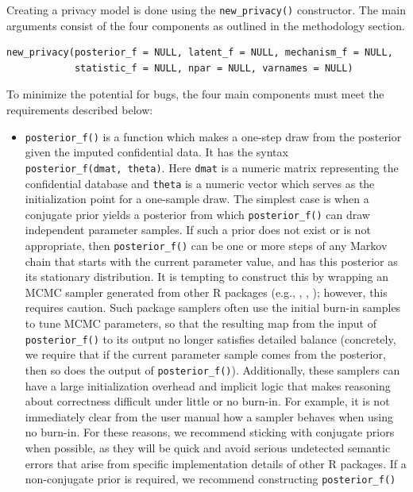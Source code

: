 Creating a privacy model is done using the \texttt{new\_privacy()} constructor. The
main arguments consist of the four components as outlined in the methodology
section.

\begin{verbatim}
new_privacy(posterior_f = NULL, latent_f = NULL, mechanism_f = NULL, 
            statistic_f = NULL, npar = NULL, varnames = NULL)
\end{verbatim}

To minimize the potential for bugs, the four main components must meet the requirements described below:

\begin{itemize}
\item
  \texttt{posterior\_f()} is a function which makes a one-step draw from the posterior given the imputed confidential data. It has
  the syntax \texttt{posterior\_f(dmat,\ theta)}. Here \texttt{dmat} is a numeric matrix representing the confidential database
  and \texttt{theta} is a numeric vector which serves as the initialization point for a one-sample draw.
  The simplest case is when a conjugate prior yields a posterior from which
  \texttt{posterior\_f()} can draw independent parameter samples.
  If such a prior does not exist or is not appropriate, then \texttt{posterior\_f()} can be
  one or more steps of any Markov chain that starts with the current parameter value,
  and has this posterior as its stationary distribution.
  It is tempting to construct this by wrapping an MCMC sampler generated from other
  R packages (e.g., ,  \citep{fmcmc_pkg},  \citep{adaptMCMC_pkg}); however, this requires caution.
  Such package samplers often use the initial burn-in samples to tune MCMC parameters,
  so that the resulting map from the input of \texttt{posterior\_f()} to its output no longer satisfies
  detailed balance (concretely, we require that if the current parameter sample comes
  from the posterior, then so does the output of \texttt{posterior\_f()}). Additionally,
  these samplers can have a large initialization overhead and implicit logic
  that makes reasoning about correctness difficult under little or no burn-in. For example,
  it is not immediately clear from the  user manual how a sampler behaves
  when using no burn-in. For these reasons,
  we recommend sticking with conjugate priors when possible, as they will be quick and avoid
  serious undetected semantic errors that arise from specific implementation details of other R packages.
  If a non-conjugate prior is required, we recommend constructing \texttt{posterior\_f()}

\end{itemize}
